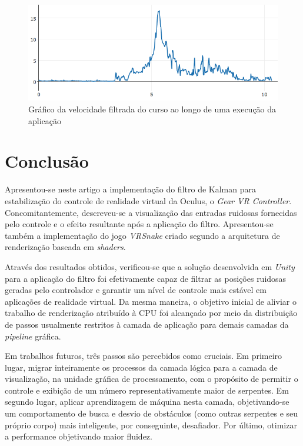 \documentclass{vgtc}                          %
\begin{document}
\begin{figure}[h!]
\centering
\includegraphics[width=\linewidth]{chart_filtered.png}
\caption{Gráfico da velocidade filtrada do curso ao longo de uma execução da aplicação}
\label{fig:chart_filtered}
\end{figure}
\FloatBarrier
\section{Conclusão} \label{sec:conclusion}

Apresentou-se neste artigo a implementação do filtro de Kalman para estabilização do controle de realidade virtual da Oculus, o \textit{Gear VR Controller}. Concomitantemente, descreveu-se a visualização das entradas ruidosas fornecidas pelo controle e o efeito resultante após a aplicação do filtro. Apresentou-se também a implementação do jogo \textit{VRSnake} criado segundo a arquitetura de renderização baseada em \textit{shaders}.

Através dos resultados obtidos, verificou-se que a solução desenvolvida em \textit{Unity} para a aplicação do filtro foi efetivamente capaz de filtrar as posições ruidosas geradas pelo controlador e garantir um nível de controle mais estável em aplicações de realidade virtual. Da mesma maneira, o objetivo inicial de aliviar o trabalho de renderização atribuído à CPU foi alcançado por meio da distribuição de passos usualmente restritos à camada de aplicação para demais camadas da \textit{pipeline} gráfica.

Em trabalhos futuros, três passos são percebidos como cruciais. Em primeiro lugar, migrar inteiramente os processos da camada lógica para a camada de visualização, na unidade gráfica de processamento, com o propósito de permitir o controle e exibição de um número representativamente maior de serpentes. Em segundo lugar, aplicar aprendizagem de máquina nesta camada, objetivando-se um comportamento de busca e desvio de obstáculos (como outras serpentes e seu próprio corpo) mais inteligente, por conseguinte, desafiador. Por último, otimizar a performance objetivando maior fluidez.



\end{document}
